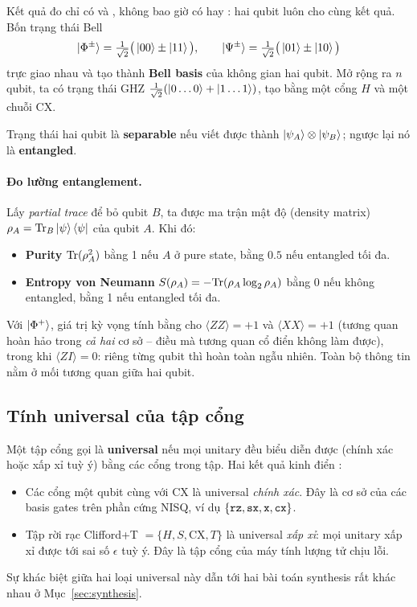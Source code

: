 Kết quả đo chỉ có  và , không bao giờ có  hay : hai qubit luôn
cho cùng kết quả. Bốn trạng thái Bell
\begin{equation}
  \ket{\Phi^\pm} = \tfrac{1}{\sqrt2}\big(\ket{00}\pm\ket{11}\big), \qquad
  \ket{\Psi^\pm} = \tfrac{1}{\sqrt2}\big(\ket{01}\pm\ket{10}\big)
\end{equation}
trực giao nhau và tạo thành \textbf{Bell basis} của không gian hai qubit. Mở rộng ra $n$ qubit, ta có
trạng thái GHZ $\tfrac{1}{\sqrt2}(\ket{0\dots0}+\ket{1\dots1})$, tạo bằng một cổng $H$ và một chuỗi
CX.

\begin{definition}
Trạng thái hai qubit là \textbf{separable} nếu viết được thành $\ket{\psi_A}\otimes\ket{\psi_B}$;
ngược lại nó là \textbf{entangled}.
\end{definition}

\paragraph{Đo lường entanglement.} Lấy \emph{partial trace} để bỏ qubit $B$, ta được ma trận mật độ
(density matrix) $\rho_A = \mathrm{Tr}_B\ket{\psi}\bra{\psi}$ của qubit $A$. Khi đó:
\begin{itemize}[noitemsep]
  \item \textbf{Purity} $\mathrm{Tr}(\rho_A^2)$ bằng 1 nếu $A$ ở pure state, bằng $0.5$ nếu entangled tối đa.
  \item \textbf{Entropy von Neumann} $S(\rho_A) = -\mathrm{Tr}(\rho_A\log_2\rho_A)$ bằng 0 nếu không
    entangled, bằng 1 nếu entangled tối đa.
\end{itemize}
Với $\ket{\Phi^+}$, giá trị kỳ vọng tính bằng  cho $\langle ZZ\rangle = +1$ và
$\langle XX\rangle = +1$ (tương quan hoàn hảo trong \emph{cả hai} cơ sở -- điều mà tương quan cổ điển
không làm được), trong khi $\langle ZI\rangle = 0$: riêng từng qubit thì hoàn toàn ngẫu nhiên. Toàn
bộ thông tin nằm ở mối tương quan giữa hai qubit.

\subsection{Tính universal của tập cổng}

Một tập cổng gọi là \textbf{universal} nếu mọi unitary đều biểu diễn được (chính xác hoặc xấp xỉ tuỳ
ý) bằng các cổng trong tập. Hai kết quả kinh điển \cite{nielsen2010, barenco1995}:
\begin{itemize}[noitemsep]
  \item Các cổng một qubit cùng với CX là universal \emph{chính xác}. Đây là cơ sở của các basis
    gates trên phần cứng NISQ, ví dụ $\{\texttt{rz}, \texttt{sx}, \texttt{x}, \texttt{cx}\}$.
  \item Tập rời rạc Clifford+T $= \{H, S, \mathrm{CX}, T\}$ là universal \emph{xấp xỉ}: mọi unitary
    xấp xỉ được tới sai số $\epsilon$ tuỳ ý. Đây là tập cổng của máy tính lượng tử chịu lỗi.
\end{itemize}
Sự khác biệt giữa hai loại universal này dẫn tới hai bài toán synthesis rất khác nhau ở
Mục~\ref{sec:synthesis}.

